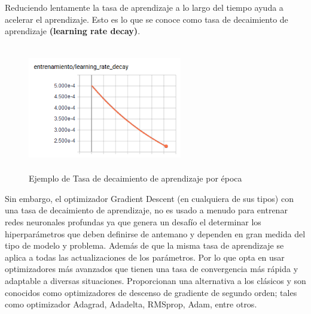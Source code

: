 		Reduciendo lentamente la tasa de aprendizaje a lo largo del tiempo ayuda a acelerar el aprendizaje. Esto es lo que se conoce como tasa de decaimiento de aprendizaje {\bf(learning rate decay)}.
			\begin{figure}[H]
				\begin{center}
				\includegraphics[width=0.6\textwidth,height=5.5cm]{images/desarrollo/entrenamiento/LR_decay} 
				\end{center}
				\begin{center}
				\caption{\small{Ejemplo de Tasa de decaimiento de aprendizaje por época  }}
				\vspace{-0.5em}
				{\small{\fontsize{10}{16.8}\selectfont {Fuente: Elaboración propia}}}
				\end{center}
				\vspace{-1.5em}
			\end{figure}
		Sin embargo, el optimizador Gradient Descent (en cualquiera de sus tipos) con una tasa de decaimiento de aprendizaje, no es usado a menudo para entrenar redes neuronales profundas ya que genera un desafío el determinar los hiperparámetros que deben definirse de antemano y dependen en gran medida del tipo de modelo y problema. Además de que la misma tasa de aprendizaje se aplica a todas las actualizaciones de los parámetros. Por lo que opta en usar optimizadores más avanzados que tienen una tasa de convergencia más rápida y adaptable a diversas situaciones. Proporcionan una alternativa a los clásicos y son conocidos como optimizadores de descenso de gradiente de segundo orden; tales como optimizador Adagrad, Adadelta, RMSprop, Adam, entre otros. 

